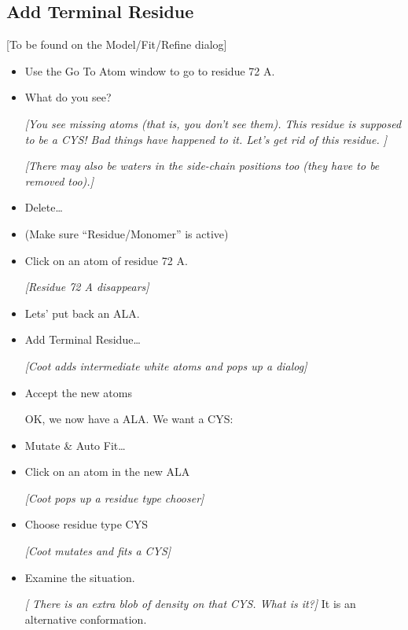 \documentclass{article}
\begin{document}
\subsection{Add Terminal Residue}
[To be found on the Model/Fit/Refine dialog]

\begin{itemize}
\item Use the Go To Atom window to go to residue 72 A.

\item What do you see?
  
  \emph{[You see missing atoms (that is, you don't see them).  This residue
  is supposed to be a CYS!  Bad things have happened to it.  Let's get
  rid of this residue. ]}
  
  \emph{[There may also be waters in the side-chain positions too (they have
  to be removed too).]} 

\item \textsf{Delete\ldots}

\item (Make sure ``Residue/Monomer'' is active)

\item Click on an atom of residue 72 A.

\textsl{  [Residue 72 A disappears]}

\item Lets' put back an ALA.

\item \textsf{Add Terminal Residue\ldots}

\textsl{  [Coot adds intermediate white atoms and pops up a dialog]}

\item \textsf{Accept} the new atoms

OK, we now have a ALA.  We want a CYS:

\item \textsf{Mutate \& Auto Fit\ldots}

\item Click on an atom in the new ALA

\textsl{  [Coot pops up a residue type chooser]}

\item Choose residue type \textsf{CYS}

\textsl{  [Coot mutates and fits a CYS]}

\item Examine the situation.

\emph{[ There is an extra blob of density on that CYS.  What is it?]}
It is an alternative conformation.


\end{itemize}
\end{document}
